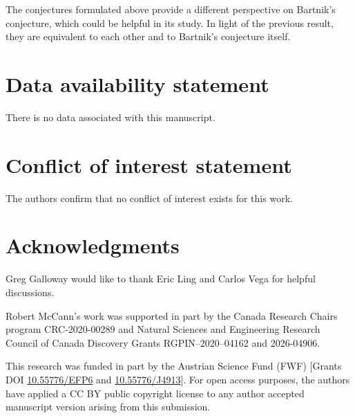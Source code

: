 \documentclass[a4paper,11pt]{article}
\numberwithin{equation}{section}
\theoremstyle{definition}
\theoremstyle{plain}
\begin{document}
The conjectures formulated above provide a different perspective on Bartnik's conjecture, which could be helpful in its study. In light of the previous result, they are equivalent to each other and to Bartnik's conjecture itself.

\section*{Data availability statement}

There is no data associated with this manuscript.

\section*{Conflict of interest statement}

The authors confirm that no conflict of interest exists for this work.

\section*{Acknowledgments}

Greg Galloway would like to thank Eric Ling and Carlos Vega for helpful discussions.

Robert McCann's work was supported in part by the Canada Research Chairs program CRC-2020-00289 and Natural Sciences and Engineering Research Council of Canada Discovery Grants RGPIN--2020--04162 and 2026-04906. 

This research was funded in part by the Austrian Science Fund (FWF) [Grants DOI \href{https://doi.org/10.55776/EFP6}{10.55776/EFP6} and \href{https://doi.org/10.55776/J4913}{10.55776/J4913}]. For open access purposes, the authors have applied a CC BY public copyright license to any author accepted manuscript version arising from this submission.

 

\end{document}

